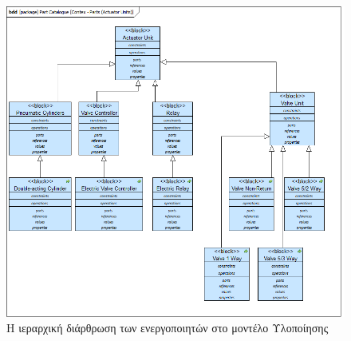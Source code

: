 \documentclass[a4paper,12pt,twoside]{report}
\begin{document}
\begin{appendices}
				\begin{figure}[hp]
					\centering
					\includegraphics[scale=0.50]{DesignModel_Contex-Parts(ActuatorUnits).png}
					\caption{Η ιεραρχική διάρθρωση των ενεργοποιητών στο μοντέλο Υλοποίησης}
					\label{φωτ:Η ιεραρχική διάρθρωση των ενεργοποιητών στο μοντέλο Υλοποίησης}
				\end{figure}
				

\end{appendices}
\end{document}
